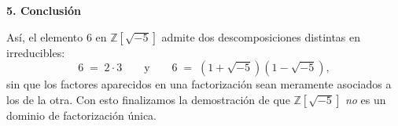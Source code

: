 \bigskip

\noindent
\textbf{5. Conclusión}

\noindent
Así, el elemento \(6\) en \(\mathbb{Z}[\sqrt{-5}]\) admite dos descomposiciones distintas en irreducibles:  
\[
6 \;=\; 2 \cdot 3 
\quad\quad\text{y}\quad\quad 
6 \;=\; (1 + \sqrt{-5})(1 - \sqrt{-5}),
\]
sin que los factores aparecidos en una factorización sean meramente asociados a los de la otra. Con esto finalizamos la demostración de que \(\mathbb{Z}[\sqrt{-5}]\) \emph{no} es un dominio de factorización única.
